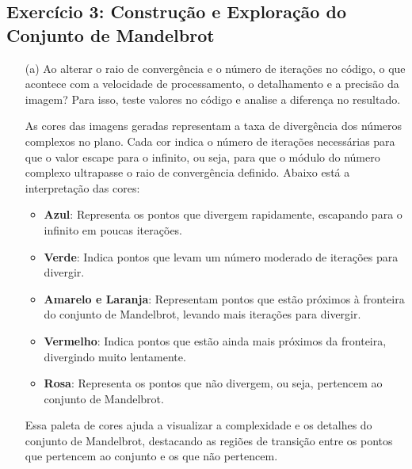 


\subsection{Exercício 3: Construção e Exploração do Conjunto de Mandelbrot}


\begin{enumerate}
  \item[(a)] Ao alterar o raio de convergência e o número de iterações no código, o que acontece com a velocidade de processamento, o detalhamento e a precisão da imagem? Para isso, teste valores no código e analise a diferença
  no resultado.

      As cores das imagens geradas representam a taxa de divergência dos números complexos no plano. Cada cor indica o número de iterações necessárias para que o valor escape para o infinito, ou seja, para que o módulo do número complexo ultrapasse o raio de convergência definido. Abaixo está a interpretação das cores:

    \begin{itemize}
        \item \textbf{Azul}: Representa os pontos que divergem rapidamente, escapando para o infinito em poucas iterações.
        \item \textbf{Verde}: Indica pontos que levam um número moderado de iterações para divergir.
        \item \textbf{Amarelo e Laranja}: Representam pontos que estão próximos à fronteira do conjunto de Mandelbrot, levando mais iterações para divergir.
        \item \textbf{Vermelho}: Indica pontos que estão ainda mais próximos da fronteira, divergindo muito lentamente.
        \item \textbf{Rosa}: Representa os pontos que não divergem, ou seja, pertencem ao conjunto de Mandelbrot.
    \end{itemize}

    Essa paleta de cores ajuda a visualizar a complexidade e os detalhes do conjunto de Mandelbrot, destacando as regiões de transição entre os pontos que pertencem ao conjunto e os que não pertencem.


\end{enumerate}
